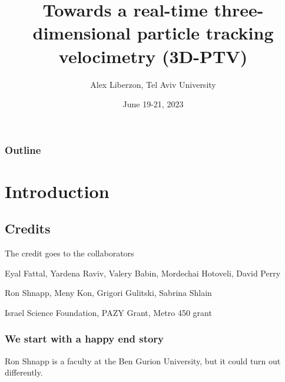 \documentclass[aspectratio=43]{beamer}
\title{Towards a real-time three-dimensional particle tracking velocimetry (3D-PTV)}
\date{June 19-21, 2023}
\author[Liberzon]{Alex Liberzon, Tel Aviv University}
\begin{document}
\begin{frame}
    \titlepage
\end{frame}

\begin{frame}\frametitle{Outline}
    \begin{card}	
    \tableofcontents
    \end{card}
\end{frame}

\section{Introduction}

%
%
%



\subsection{Credits}

\begin{frame}[label=credit-1]{The credit goes to the collaborators }
\begin{multicols}{2}
\centering
{} 
\end{multicols}
\end{frame}
%
\begin{frame}[label=credit-2]
\begin{card}
Eyal Fattal, Yardena Raviv, Valery Babin, Mordechai Hotoveli, David Perry
\end{card}
\begin{card}[TAU]
Ron Shnapp, Meny Kon, Grigori Gulitski, Sabrina Shlain
\end{card}
\begin{card}[Funding]
Israel Science Foundation, PAZY Grant, Metro 450 grant
\end{card}
\end{frame}
%

\begin{frame}[label=ron]
\frametitle{We start with a happy end story}
\begin{cardTiny}
Ron Shnapp is a faculty at the Ben Gurion University, but it could turn out differently. 
\end{cardTiny}
\end{frame}
\end{document}

